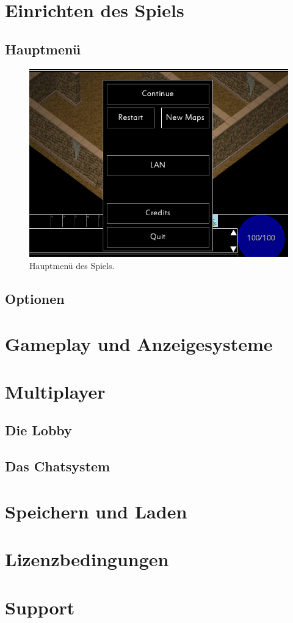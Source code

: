 \documentclass[12pt, a4paper]{scrreprt}
\begin{document}
\chapter{Einrichten des Spiels}
\section{Hauptmenü}
\begin{figure}[h]
\includegraphics[width=\textwidth]{img/menu}
\caption{Hauptmenü des Spiels.}
\end{figure}
\section{Optionen}
\chapter{Gameplay und Anzeigesysteme}
\chapter{Multiplayer}
\section{Die Lobby}
\section{Das Chatsystem}
\chapter{Speichern und Laden}
\chapter{Lizenzbedingungen}
\chapter{Support}
\end{document}
